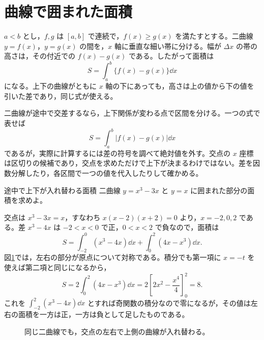 \section{曲線で囲まれた面積}\label{節:曲線間の面積}

$a<b$ とし，$f,g$ は $[a,b]$ で連続で，$f(x)\geq g(x)$ を満たすとする。二曲線 $y=f(x)$，$y=g(x)$ の間を，$x$ 軸に垂直な細い帯に分ける。幅が $\Delta x$ の帯の高さは，その付近での $f(x)-g(x)$ である。したがって面積は
\begin{equation}\label{式:上下の差の面積}
S=\int_a^b\{f(x)-g(x)\}\dd x
\end{equation}
になる。上下の曲線がともに $x$ 軸の下にあっても，高さは上の値から下の値を引いた差であり，同じ式が使える。

二曲線が途中で交差するなら，上下関係が変わる点で区間を分ける。一つの式で表せば
\[
S=\int_a^b|f(x)-g(x)|\dd x
\]
であるが，実際に計算するには差の符号を調べて絶対値を外す。交点の $x$ 座標は区切りの候補であり，交点を求めただけで上下が決まるわけではない。差を因数分解したり，各区間で一つの値を代入したりして確かめる。

\begin{example}{途中で上下が入れ替わる面積}
二曲線 $y=x^3-3x$ と $y=x$ に囲まれた部分の面積を求めよ。
\end{example}

交点は $x^3-3x=x$，すなわち $x(x-2)(x+2)=0$ より，$x=-2,0,2$ である。差 $x^3-4x$ は $-2<x<0$ で正，$0<x<2$ で負なので，面積は
\[
S=\int_{-2}^0(x^3-4x)\dd x
 +\int_0^2(4x-x^3)\dd x.
\]
図\ref{図:面積の上下交換}では，左右の部分が原点について対称である。積分でも第一項に $x=-t$ を使えば第二項と同じになるから，
\[
S=2\int_0^2(4x-x^3)\dd x
 =2\left[2x^2-\frac{x^4}{4}\right]_0^2=8.
\]
これを $\int_{-2}^2(x^3-4x)\dd x$ とすれば奇関数の積分なので零になるが，その値は左右の面積を一方は正，一方は負として足したものである。

\begin{figure}[htbp]
\centering
{}
\caption{同じ二曲線でも，交点の左右で上側の曲線が入れ替わる。}\label{図:面積の上下交換}
\end{figure}

%
